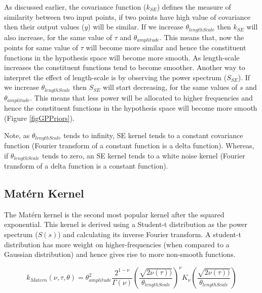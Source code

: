 As discussed earlier, the covariance function ($k_{SE}$) defines the measure of similarity between two input points, if two points have high value of covariance then their output values ($y$) will be similar. If we increase $\theta_{lengthScale}$ then $k_{SE}$ will also increase, for the same value of $\tau$ and $\theta_{amplitude}$. This means that, now the points for same value of $\tau$ will become more similar and hence the constituent functions in the hypothesis space will become more smooth. As length-scale increases the constituent functions tend to become smoother. Another way to interpret the effect of length-scale is by observing the power spectrum ($S_{SE}$). If we increase $\theta_{lengthScale}$ then $S_{SE}$ will start decreasing, for the same values of $s$ and $\theta_{amplitude}$. This means that less power will be allocated to higher frequencies and hence the constituent functions in the hypothesis space will become more smooth (Figure \ref{figGPPriors}). 


Note, as $\theta_{lengthScale}$ tends to infinity, SE kernel tends to a constant covariance function (Fourier transform of a constant function is a delta function). Whereas, if $\theta_{lengthScale}$ tends to zero, an SE kernel tends to a white noise kernel (Fourier transform of a delta function is a constant function).

\subsection{Mat\'ern Kernel}\label{subsecCh4MaternKernel}
The Mat\'ern kernel is the second most popular kernel after the squared exponential. This kernel is derived using a Student-t distribution as the power spectrum ($S(s)$) and calculating its inverse Fourier transform. A student-t distribution has more weight on higher-frequencies (when compared to a Gaussian distribution) and hence gives rise to more non-smooth functions. 

\begin{equation}
k_{Matern}(\nu, \tau, \theta) = \theta_{amplitude}^2\frac{2^{1- \nu }}{\Gamma (\nu)}\left ( \frac{\sqrt{2\nu(\tau))}}{\theta_{lengthScale}} \right )^{\nu}K_{\nu}\left ( \frac{\sqrt{2\nu(\tau))}}{\theta_{lengthScale}} \right)
\end{equation}

